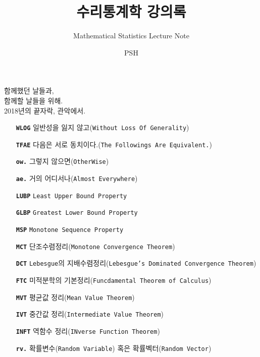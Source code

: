 \documentclass[graybox,envcountchap,envcountsame,sectrefs,fleqn]{svmono}
\begin{document}
\author{PSH}
\title{수리통계학 강의록}
\subtitle{Mathematical Statistics Lecture Note}
\maketitle

\frontmatter%

\extrachap{$ $}

\begin{flushright}
함께했던 날들과,\\
함께할 날들을 위해.\\
2018년의 끝자락, 관악에서.
\end{flushright}


\begin{itemize}
    \item[\texttt{\textbf{WLOG}}]{일반성을 잃지 않고(\texttt{Without Loss Of Generality})}
    \item[\texttt{\textbf{TFAE}}]{다음은 서로 동치이다.(\texttt{The Followings Are Equivalent.})}
    \item[\texttt{\textbf{ow.}}]{그렇지 않으면(\texttt{OtherWise})}
    \item[\texttt{\textbf{ae.}}]{거의 어디서나(\texttt{Almost Everywhere})}
    \item[\texttt{\textbf{LUBP}}]{\texttt{Least Upper Bound Property}}
    \item[\texttt{\textbf{GLBP}}]{\texttt{Greatest Lower Bound Property}}
    \item[\texttt{\textbf{MSP}}]{\texttt{Monotone Sequence Property}}
    \item[\texttt{\textbf{MCT}}]{단조수렴정리(\texttt{Monotone Convergence Theorem})}
    \item[\texttt{\textbf{DCT}}]{\texttt{Lebesgue}의 지배수렴정리(\texttt{Lebesgue's Dominated Convergence Theorem})}
    \item[\texttt{\textbf{FTC}}]{미적분학의 기본정리(\texttt{Funcdamental Theorem of Calculus})}
    \item[\texttt{\textbf{MVT}}]{평균값 정리(\texttt{Mean Value Theorem})}
    \item[\texttt{\textbf{IVT}}]{중간값 정리(\texttt{Intermediate Value Theorem})}
    \item[\texttt{\textbf{INFT}}]{역함수 정리(\texttt{INverse Function Theorem})}
    \item[\texttt{\textbf{rv.}}]{확률변수(\texttt{Random Variable}) 혹은 확률벡터(\texttt{Random Vector})}

\end{itemize}
\end{document}
